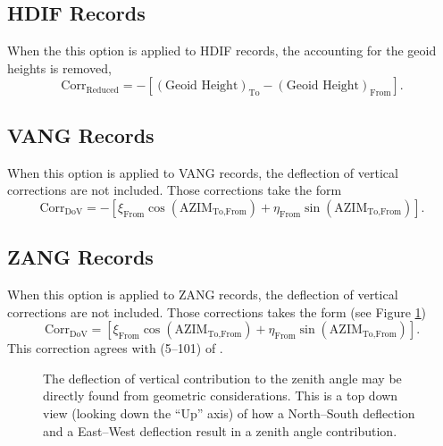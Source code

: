 \subsection{HDIF Records}
When the this option is applied to HDIF records, the accounting for the geoid heights is removed,
\begin{equation}
\text{Corr}_{\text{Reduced}} = -\left[\left(\text{Geoid Height}\right)_{\text{To}}-\left(\text{Geoid Height}\right)_{\text{From}}\right].
\end{equation}
\subsection{VANG Records}
When this option is applied to VANG records, the deflection of vertical corrections are not included.  Those corrections take the form
\begin{equation}
\text{Corr}_{\text{DoV}}=-\left[\xi_{\text{From}}\cos\left(\text{AZIM}_{\text{To,From}}\right)+\eta_{\text{From}}\sin\left(\text{AZIM}_{\text{To,From}}\right)\right].
\end{equation}
\subsection{ZANG Records}
When this option is applied to ZANG records, the deflection of vertical corrections are not included.  Those corrections takes the form (see Figure \ref{Fig:ZANG_DOV})
\begin{equation}
\text{Corr}_{\text{DoV}}=\left[\xi_{\text{From}}\cos\left(\text{AZIM}_{\text{To,From}}\right)+\eta_{\text{From}}\sin\left(\text{AZIM}_{\text{To,From}}\right)\right].
\end{equation}
This correction agrees with (5--101) of \cite{wellenhof}.
\begin{figure}[!htbp]
\centering
{}
\caption{The deflection of vertical contribution to the zenith angle may be directly found from geometric considerations.  This is a top down view (looking down the ``Up'' axis) of how a North--South deflection and a East--West deflection result in a zenith angle contribution.}
\label{Fig:ZANG_DOV}
\end{figure}
